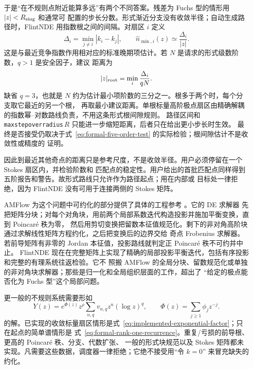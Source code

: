 \documentclass[11pt,a4paper]{ctexart}
\renewcommand{\_}{\origunderscore\allowbreak}
\begin{document}
于是“在不规则点附近能算多远”有两个不同答案。残差为 Fuchs 型的情形用 $|z|<R_{\rm sing}$ 和通常可
配置的步长分数。形式渐近分支没有收敛半径；自动生成路径时，FlintNDE 用指数根之间的间隔。对扇区 $i$
定义
\begin{equation}
 \Delta_i=\min_{j\ne i}|k_i-k_j|,
 \qquad
 \widehat n_{\min,i}(z)\simeq\frac{\Delta_i}{|z|}.
 \label{eq:formal-root-gap-estimate}
\end{equation}
这是与最近竞争指数作用相对应的标准晚期项估计。若 $N$ 是请求的形式级数阶数，$q>1$ 是安全因子，建议
距离为
\begin{equation}
 |z|_{\rm root}=\min_i\frac{\Delta_i}{qN}.
 \label{eq:formal-root-gap-point}
\end{equation}
缺省 $q=3$，也就是 $N$ 约为估计最小项阶数的三分之一。根多于两个时，每个分支取它最近的另一个根，
再取最小建议距离。单根标量高阶极点扇区由精确解耦的指数幂--对数路线负责，不用这条形式根间隙规则。
路径区间和 \texttt{max\_step\_over\_radius}$\,R$ 只能进一步缩短距离，后者只在给出更小步长时生效。
最终是否接受仍取决于式~\eqref{eq:formal-five-order-test} 的实际检验；根间隙估计不是收敛性或精度的
证明。

因此到最近其他奇点的距离只是参考尺度，不是收敛半径。用户必须停留在一个 Stokes 扇区内，并检验阶数和
匹配点的稳定性。用户给出的首批匹配点同样得到五阶报告和警告。故形式路线只允许作为路径起点；用在内部或
目标处一律拒绝，因为 FlintNDE 没有可用于连接两侧的 Stokes 矩阵。

AMFlow 为这个问题中可约化的部分提供了具体的工程参考 \cite{Liu:2022chg,Huang:2026rjb}。它的 DE 求解器
先把矩阵分块；对每个对角块，用前两个局部系数迭代构造投影并施加平衡变换，直到 Poincar\'e 秩为零，
然后用剪切变换把留数本征值规范化。剩下的非对角高阶块通过求解线性矩阵方程约化，之后把变换后的边界交给
奇点 Frobenius 求解器。若前导矩阵有非零的 Jordan 本征值，投影路线就判定正 Poincar\'e 秩不可约并中止。
FlintNDE 现在在完整矩阵上实现了精确的局部投影平衡迭代，包括有序投影和完整的有理系统往返检验。它不
照搬 AMFlow 的全局分块、留数规范化或单独的非对角块求解器；那些是归一化和全局组织层面的工作，超出了
“给定的极点能否化为 Fuchs 型”这个局部问题。

更一般的不规则系统需要形如
\begin{equation}
  Y(z)=e^{\Phi(z)}z^\rho
  \sum_{n,q}v_{n,q}z^n(\log z)^q,
  \qquad
  \Phi(z)=\sum_{j\geq1}\phi_j z^{-j}.
  \label{eq:irregular-ansatz}
\end{equation}
的解。已实现的收敛标量扇区情形是式~\eqref{eq:implemented-exponential-factor}；只在起点的简单谱情形是
式~\eqref{eq:formal-rank-one-recurrence}。重复/亏损的前导根、更高的 Poincar\'e 秩、分支、代数扩张、
一般的形式块规范以及 Stokes 矩阵都未实现。凡需要这些数据，调度器一律拒绝；它绝不接受用“令 $k=0$”
来冒充缺失的约化。
\end{document}
